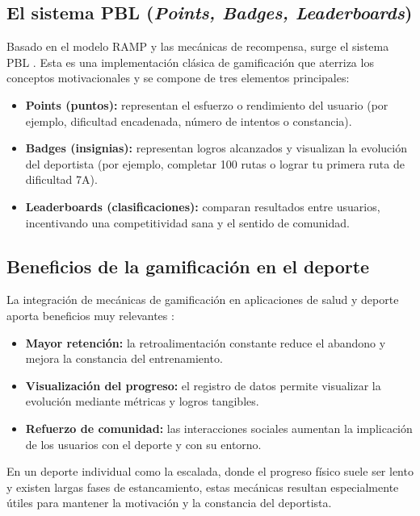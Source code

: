 \subsection{El sistema PBL (\textit{Points, Badges, Leaderboards})}

Basado en el modelo RAMP y las mecánicas de recompensa, surge el sistema PBL \citep{marczewski2013pbl}. Esta es una implementación clásica de gamificación que aterriza los conceptos motivacionales y se compone de tres elementos principales:

\begin{itemize}
	\item \textbf{Points (puntos):} representan el esfuerzo o rendimiento del usuario (por ejemplo, dificultad encadenada, número de 
	intentos o constancia).
	\item \textbf{Badges (insignias):} representan logros alcanzados y visualizan la evolución del deportista (por ejemplo, completar 
	100 rutas o lograr tu primera ruta de dificultad 7A).
	\item \textbf{Leaderboards (clasificaciones):} comparan resultados entre usuarios, incentivando una competitividad sana y el sentido 
	de comunidad.
\end{itemize}

\subsection{Beneficios de la gamificación en el deporte}

La integración de mecánicas de gamificación en aplicaciones de salud y deporte aporta beneficios muy relevantes \citep{koivisto2019rise}:

\begin{itemize}
	\item \textbf{Mayor retención:} la retroalimentación constante reduce el abandono y mejora la constancia del entrenamiento.
	\item \textbf{Visualización del progreso:} el registro de datos permite visualizar la evolución mediante métricas y logros tangibles.
	\item \textbf{Refuerzo de comunidad:} las interacciones sociales aumentan la implicación de los usuarios con el deporte y con su entorno.
\end{itemize}

En un deporte individual como la escalada, donde el progreso físico suele ser lento y existen largas fases de estancamiento, estas mecánicas resultan especialmente útiles para mantener la motivación y la constancia del deportista.


